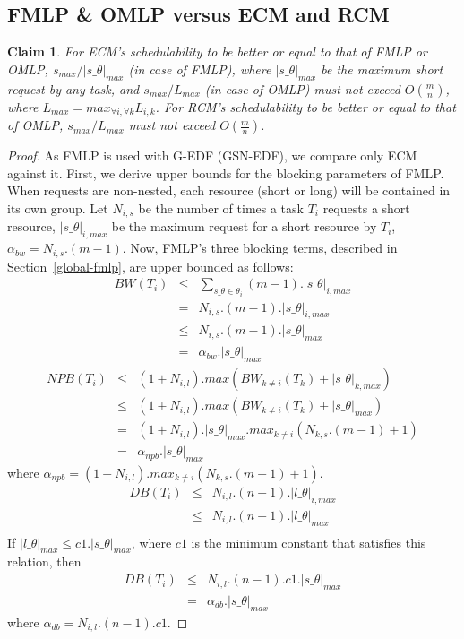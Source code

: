 \documentclass[a4paper,english]{article}
\newtheorem{clm}{Claim}
\newtheorem{proof}{Proof}
\begin{document}
\subsection{FMLP \& OMLP versus ECM and RCM
}

\begin{clm}
For ECM's schedulability to be better or equal to that of FMLP or OMLP, 
$s_{max}/|s\_\theta|_{max}$ (in case of FMLP), where $|s\_\theta|_{max}$ be the maximum short request by any task, and $s_{max}/L_{max}$ (in case of OMLP) must  not exceed $O(\frac{m}{n})$, where $L_{max}=max_{\forall i,\forall k}L_{i,k}$. For RCM's schedulability  
to be better or equal  
to that of OMLP, $s_{max}/L_{max}$ must not exceed $O(\frac{m}{n})$.
\end{clm}
\begin{proof}\normalfont
As FMLP is used with G-EDF (GSN-EDF), we compare only ECM 
against it. 
First, we derive upper bounds for the blocking parameters of FMLP. When requests are non-nested, each resource (short or long) will be contained in its own group. Let $N_{i,s}$ be the number of times a task $T_{i}$ requests a short
resource, $|s\_\theta|_{i,max}$ be the maximum request for a
short resource by $T_{i}$, $\alpha_{bw}=N_{i,s}.(m-1)$. Now, FMLP's three  blocking terms, described in Section~\ref{global-fmlp}, are upper bounded as follows:
\begin{eqnarray*}
BW(T_{i}) & \le & \sum_{s\_\theta\in\theta_{i}}(m-1).|s\_\theta|_{i,max}\\
 & = & N_{i,s}.(m-1).|s\_\theta|_{i,max}\\
 & \le & N_{i,s}.(m-1).|s\_\theta|_{max}\\
& = & \alpha_{bw}.|s\_\theta|_{max}
 \end{eqnarray*}
\begin{eqnarray*}
NPB\left(T_{i}\right) & \le & \left(1+N_{i,l}\right).max\left(BW_{k\ne i}\left(T_{k}\right)+|s\_\theta|_{k,max}\right)\\
 & \le & \left(1+N_{i,l}\right).max\left(BW_{k\ne i}\left(T_{k}\right)+|s\_\theta|_{max}\right)\\
 & = & \left(1+N_{i,l}\right).|s\_\theta|_{max}.max_{k\ne i}\left(N_{k,s}.\left(m-1\right)+1\right)\\
 & = & \alpha_{npb}.|s\_\theta|_{max}
 \end{eqnarray*}
 where $\alpha_{npb}=\left(1+N_{i,l}\right).max_{k\ne i}\left(N_{k,s}.\left(m-1\right)+1\right)$.
\begin{eqnarray*}
DB\left(T_{i}\right) & \le & N_{i,l}.\left(n-1\right).|l\_\theta|_{i,max}\\
 & \le & N_{i,l}.\left(n-1\right).|l\_\theta|_{max}\\
 \end{eqnarray*}
If $|l\_\theta|_{max}\le c1.|s\_\theta|_{max}$, where $c1$ is the
minimum constant that satisfies this relation, then
\begin{eqnarray*}
DB\left(T_{i}\right)& \le & N_{i,l}.\left(n-1\right).c1.|s\_\theta|_{max}\\
& = & \alpha_{db}.|s\_\theta|_{max}
\end{eqnarray*}
where $\alpha_{db}=N_{i,l}.\left(n-1\right).c1$. 


\end{proof}
\end{document}
